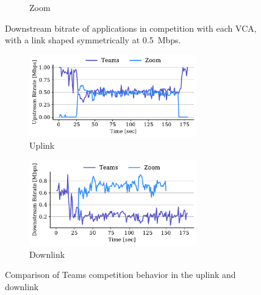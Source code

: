 \begin{figure}[t!]
\begin{subfigure}[t]{.33\textwidth}
    \caption{Zoom}
    \label{fig:zoom-dl-boxplot-0.5}
\end{subfigure}
\caption{Downstream bitrate of applications in competition with each VCA, with a link shaped symmetrically at 0.5~Mbps.}
\label{fig:dnld-boxplot}
\end{figure}

\begin{figure}[t!]
\centering
\begin{subfigure}[t]{.5\textwidth}
    \centering
    \includegraphics[width=0.8\textwidth]{figures/comp_ts/teams_zoom_1_ul_r2.pdf}
    \caption{Uplink}
    \label{fig:teams-zoom-up-1}
\end{subfigure}\hfill
\begin{subfigure}[t]{.5\textwidth}
    \centering
    \includegraphics[width=0.8\textwidth]{figures/comp_ts/teams_zoom_1_dl_r2.pdf}
    \caption{Downlink}
    \label{fig:teams-zoom-down-1}
\end{subfigure}
\caption{Comparison of Teams competition behavior in the uplink and downlink}
\label{fig:teams-zoom-1}
\end{figure}


